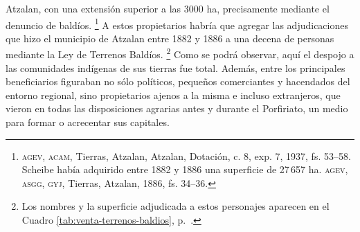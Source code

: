 \documentclass[14pt,twoside,final]{extbook} %
\let\oldfootnote\footnote
\renewcommand\footnote[1]{%
\oldfootnote{\hspace{1mm}#1}}
\begin{document}
Atzalan, con una extensión superior a las 3000 ha, precisamente mediante el denuncio de baldíos.\footnote{\textsc{agev, acam}, Tierras, Atzalan, Atzalan, Dotación, c. 8, exp. 7, 1937, fs. 53--58. Scheibe\index[nombres]{Scheibe, Gustavo} había adquirido entre 1882 y 1886 una superficie de 27\,657 ha. \textsc{agev, asgg, gyj}, Tierras, Atzalan, 1886, fs. 34--36.} A estos propietarios habría que agregar las adjudicaciones que hizo el municipio de Atzalan entre 1882 y 1886 a una decena de personas mediante la Ley de Terrenos Baldíos.\footnote{Los nombres y la superficie adjudicada a estos personajes aparecen en el Cuadro  \ref{tab:venta-terrenos-baldios}, p.~\pageref{tab:venta-terrenos-baldios}.} Como se podrá observar, aquí el despojo a las comunidades indígenas de sus tierras fue total. Además, entre los principales beneficiarios figuraban no sólo políticos, pequeños comerciantes y hacendados del entorno regional, sino propietarios ajenos a la misma e incluso extranjeros, que vieron en todas las disposiciones agrarias antes y durante el Porfiriato, un medio para formar o acrecentar sus capitales.
\end{document}
